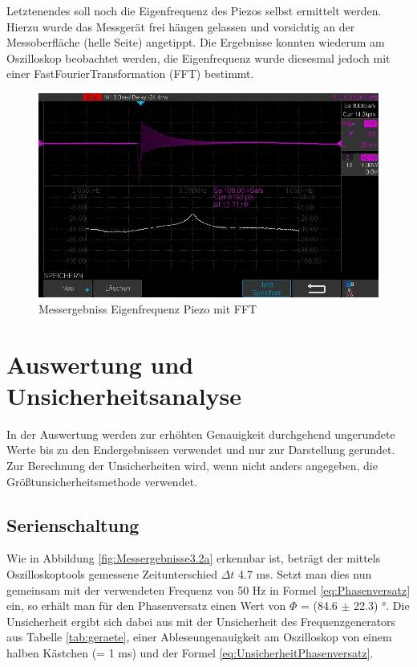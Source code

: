 \documentclass[12pt,a4paper,twoside]{article}
\begin{document}
\noindent
Letztenendes soll noch die Eigenfrequenz des Piezos selbst ermittelt werden. Hierzu wurde das Messgerät frei hängen gelassen und vorsichtig an der Messoberfläche (helle Seite) angetippt.
Die Ergebnisse konnten wiederum am Oszilloskop beobachtet werden, die Eigenfrequenz wurde diesesmal jedoch mit einer FastFourierTransformation (FFT) bestimmt.

\begin{figure}[H]
    \centering
    \includegraphics[width=0.6\linewidth, angle=0]{Messergebnisse/3.4 EigenfrequenzDing/DSO00001.jpg}
    \caption{Messergebniss Eigenfrequenz Piezo mit FFT}
    \label{fig:MessergebnissEigenfrequenzPiezo}
\end{figure}


\section{Auswertung und Unsicherheitsanalyse} %

In der Auswertung werden zur erhöhten Genauigkeit durchgehend ungerundete Werte bis zu den Endergebnissen verwendet und nur zur Darstellung gerundet. \\
Zur Berechnung der Unsicherheiten wird, wenn nicht anders angegeben, die Größtunsicherheitsmethode verwendet.

\subsection{Serienschaltung}

Wie in Abbildung \ref{fig:Messergebnisse3.2a} erkennbar ist, beträgt der mittels Oszilloskoptools gemessene Zeitunterschied $\Delta t$ 4.7 ms. Setzt man dies nun gemeinsam mit der verwendeten Frequenz von 50 Hz in Formel \ref{eq:Phasenversatz} ein, so erhält man für den Phasenversatz einen Wert von $\Phi$ = (84.6 $\pm$ 22.3) °. 
Die Unsicherheit ergibt sich dabei aus mit der Unsicherheit des Frequenzgenerators aus Tabelle \ref{tab:geraete}, einer Ableseungenauigkeit am Oszilloskop von einem halben Kästchen (= 1 ms) und der Formel \ref{eq:UnsicherheitPhasenversatz}. \newline
\end{document}
